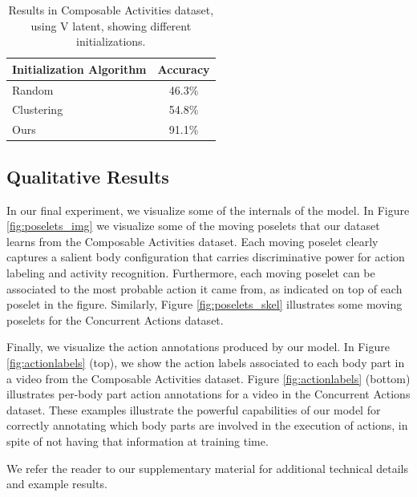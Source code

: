 \begin{table}[tb]
\footnotesize
\centering
\begin{tabular}{|l|c|}
\hline
\textbf{Initialization Algorithm} & \textbf{Accuracy}\\
\hline
Random   & 46.3\% \\
Clustering   & 54.8\% \\
Ours   & 91.1\% \\
\hline
\end{tabular}
\caption{
\footnotesize
Results in Composable Activities dataset, using V latent, showing different initializations. }
\label{tab:initialization}
\vspace{-3mm}
\end{table}

\subsection{Qualitative Results}
In our final experiment, we visualize some of the internals of the model.
In Figure \ref{fig:poselets_img} we visualize some of the moving poselets
that our dataset learns from the Composable Activities dataset.
Each moving poselet clearly captures a salient body configuration that
carries discriminative power for action labeling and activity recognition.
Furthermore, each moving poselet can be associated to the most probable
action it came from, as indicated on top of each poselet in the figure.
Similarly, Figure \ref{fig:poselets_skel} illustrates some moving poselets
for the Concurrent Actions dataset.

Finally, we visualize the action annotations produced by our model. In
Figure \ref{fig:actionlabels} (top), we show the action labels associated
to each body part in a video from the Composable Activities dataset.
Figure \ref{fig:actionlabels} (bottom) illustrates per-body part action
annotations for a video in the Concurrent Actions dataset. These
examples illustrate the powerful capabilities of our model for correctly
annotating which body parts are involved in the execution of actions,
in spite of not having that information at training time.

We refer the reader to our supplementary material for additional technical
details and example results.





